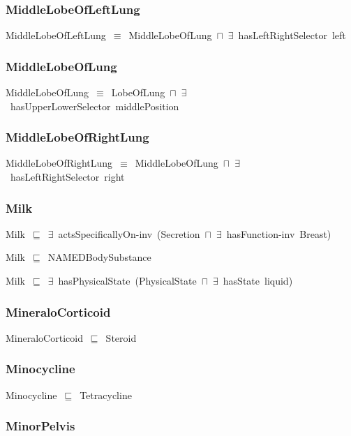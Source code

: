 \documentclass{article}
\begin{document}
\subsubsection*{MiddleLobeOfLeftLung}

MiddleLobeOfLeftLung~\ensuremath{\equiv}~MiddleLobeOfLung~\ensuremath{\sqcap}~\ensuremath{\exists}~hasLeftRightSelector~left

\subsubsection*{MiddleLobeOfLung}

MiddleLobeOfLung~\ensuremath{\equiv}~LobeOfLung~\ensuremath{\sqcap}~\ensuremath{\exists}~hasUpperLowerSelector~middlePosition

\subsubsection*{MiddleLobeOfRightLung}

MiddleLobeOfRightLung~\ensuremath{\equiv}~MiddleLobeOfLung~\ensuremath{\sqcap}~\ensuremath{\exists}~hasLeftRightSelector~right

\subsubsection*{Milk}

Milk~\ensuremath{\sqsubseteq}~\ensuremath{\exists}~actsSpecificallyOn-inv~(Secretion~\ensuremath{\sqcap}~\ensuremath{\exists}~hasFunction-inv~Breast)~

Milk~\ensuremath{\sqsubseteq}~NAMEDBodySubstance~

Milk~\ensuremath{\sqsubseteq}~\ensuremath{\exists}~hasPhysicalState~(PhysicalState~\ensuremath{\sqcap}~\ensuremath{\exists}~hasState~liquid)~

\subsubsection*{MineraloCorticoid}

MineraloCorticoid~\ensuremath{\sqsubseteq}~Steroid~

\subsubsection*{Minocycline}

Minocycline~\ensuremath{\sqsubseteq}~Tetracycline~

\subsubsection*{MinorPelvis}
\end{document}

